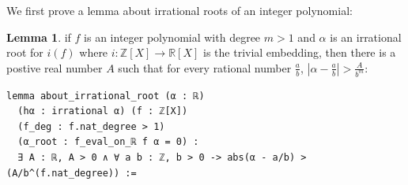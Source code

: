 \documentclass{report}
\theoremstyle{definition}
\newtheorem{lemma}{Lemma}[section]
\begin{document}
We first prove a lemma about irrational roots of an integer polynomial:
\begin{lemma}\label{lemma:irrationalRoot}
if $f$ is an integer polynomial with degree $m>1$ and $\alpha$ is an irrational root for $i(f)$ where $i:\mathbb Z[X]\to\mathbb R[X]$ is the trivial embedding, then there is a postive real number $A$ such that for every rational number $\frac ab$, $\left|\alpha-\frac ab\right| >\frac A {b^m}$:  

\begin{verbatim}
lemma about_irrational_root (α : ℝ)
  (hα : irrational α) (f : ℤ[X]) 
  (f_deg : f.nat_degree > 1)
  (α_root : f_eval_on_ℝ f α = 0) :
  ∃ A : ℝ, A > 0 ∧ ∀ a b : ℤ, b > 0 -> abs(α - a/b) > (A/b^(f.nat_degree)) :=
\end{verbatim}
\end{lemma}
\end{document}
